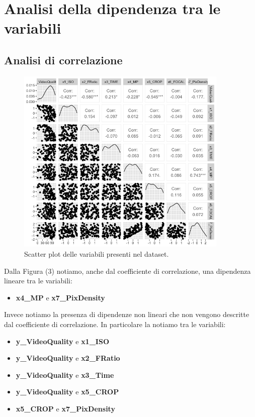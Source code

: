 \section{Analisi della dipendenza tra le variabili}

\subsection{Analisi di correlazione}

\begin{figure}[H]
	\centering
	\includegraphics[width=0.90\textwidth]{../graphs/DescriptiveStatisticPlots/ggplot}
	\caption{Scatter plot delle variabili presenti nel dataset.}
\end{figure}

Dalla Figura (3) notiamo, anche dal coefficiente di correlazione, una dipendenza lineare tra le variabili:
\begin{itemize}
	\item \textbf{x4\_MP} e \textbf{x7\_PixDensity}
\end{itemize}
Invece notiamo la presenza di dipendenze non lineari che non vengono descritte dal coefficiente di correlazione. In particolare la notiamo tra le variabili:
\begin{itemize}
	\item \textbf{y\_VideoQuality} e \textbf{x1\_ISO}
	\item \textbf{y\_VideoQuality} e \textbf{x2\_FRatio}
	\item \textbf{y\_VideoQuality} e \textbf{x3\_Time}
	\item \textbf{y\_VideoQuality} e \textbf{x5\_CROP}
	\item \textbf{x5\_CROP} e \textbf{x7\_PixDensity}
\end{itemize}

